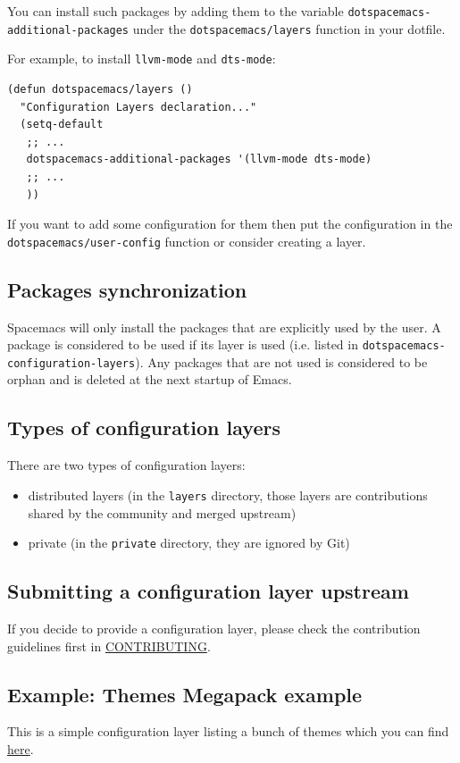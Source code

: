 \documentclass[11pt]{article}
\begin{document}
You can install such packages by adding them to the variable
\texttt{dotspacemacs-additional-packages} under the \texttt{dotspacemacs/layers} function in your dotfile.

For example, to install \texttt{llvm-mode} and \texttt{dts-mode}:
\begin{verbatim}
(defun dotspacemacs/layers ()
  "Configuration Layers declaration..."
  (setq-default
   ;; ...
   dotspacemacs-additional-packages '(llvm-mode dts-mode)
   ;; ...
   ))
\end{verbatim}

If you want to add some configuration for them then put the configuration in
the \texttt{dotspacemacs/user-config} function or consider creating a layer.

\subsection{Packages synchronization}
\label{sec:orgcd82dc2}
Spacemacs will only install the packages that are explicitly used by the user.
A package is considered to be used if its layer is used (i.e. listed in
\texttt{dotspacemacs-configuration-layers}).
Any packages that are not used is considered to be orphan and is deleted at
the next startup of Emacs.

\subsection{Types of configuration layers}
\label{sec:org15bae51}
There are two types of configuration layers:
\begin{itemize}
\item distributed layers (in the \texttt{layers} directory, those layers are contributions shared
by the community and merged upstream)
\item private (in the \texttt{private} directory, they are ignored by Git)
\end{itemize}

\subsection{Submitting a configuration layer upstream}
\label{sec:org64da027}
If you decide to provide a configuration layer, please check the contribution
guidelines first in \href{../CONTRIBUTING.org}{CONTRIBUTING}.

\subsection{Example: Themes Megapack example}
\label{sec:org9426a77}
This is a simple configuration layer listing a bunch of themes which you can
find \href{../layers/+themes/themes-megapack/README.org}{here}.
\end{document}
